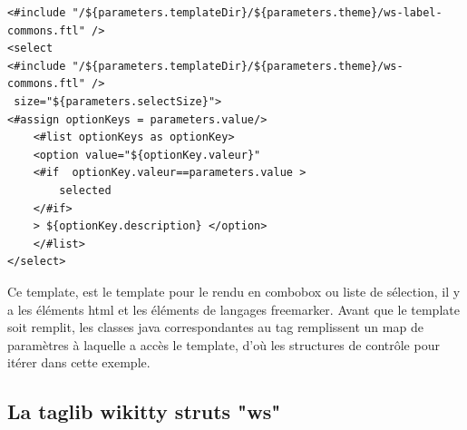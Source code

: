 


\begin{lstlisting}
<#include "/${parameters.templateDir}/${parameters.theme}/ws-label-commons.ftl" />
<select 
<#include "/${parameters.templateDir}/${parameters.theme}/ws-commons.ftl" />
 size="${parameters.selectSize}">
<#assign optionKeys = parameters.value/>
    <#list optionKeys as optionKey>
	<option value="${optionKey.valeur}"
	<#if  optionKey.valeur==parameters.value >
		selected
	</#if>
	> ${optionKey.description} </option>
	</#list>
</select>
\end{lstlisting}

Ce template, est le template pour le rendu en combobox ou liste de sélection,
il y a les éléments html et les éléments de langages freemarker. Avant que le
template soit remplit, les classes java correspondantes au tag remplissent 
un map de paramètres à laquelle a accès le template, d'où les structures de contrôle
pour itérer dans cette exemple. 


\subsection{La taglib wikitty struts "ws"}

